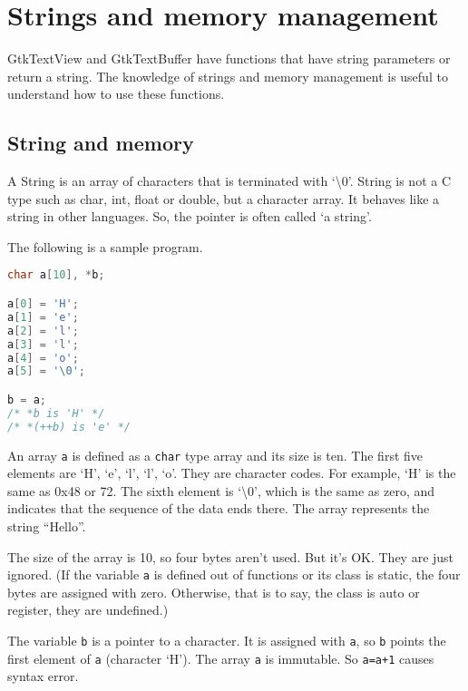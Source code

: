 \section{Strings and memory
management}\label{strings-and-memory-management}

GtkTextView and GtkTextBuffer have functions that have string parameters
or return a string. The knowledge of strings and memory management is
useful to understand how to use these functions.

\subsection{String and memory}\label{string-and-memory}

A String is an array of characters that is terminated with
`\textbackslash0'. String is not a C type such as char, int, float or
double, but a character array. It behaves like a string in other
languages. So, the pointer is often called `a string'.

The following is a sample program.

\begin{lstlisting}[language=C]
char a[10], *b;

a[0] = 'H';
a[1] = 'e';
a[2] = 'l';
a[3] = 'l';
a[4] = 'o';
a[5] = '\0';

b = a;
/* *b is 'H' */
/* *(++b) is 'e' */
\end{lstlisting}

An array \passthrough{\lstinline!a!} is defined as a
\passthrough{\lstinline!char!} type array and its size is ten. The first
five elements are `H', `e', `l', `l', `o'. They are character codes. For
example, `H' is the same as 0x48 or 72. The sixth element is
`\textbackslash0', which is the same as zero, and indicates that the
sequence of the data ends there. The array represents the string
``Hello''.

The size of the array is 10, so four bytes aren't used. But it's OK.
They are just ignored. (If the variable \passthrough{\lstinline!a!} is
defined out of functions or its class is static, the four bytes are
assigned with zero. Otherwise, that is to say, the class is auto or
register, they are undefined.)

The variable \passthrough{\lstinline!b!} is a pointer to a character. It
is assigned with \passthrough{\lstinline!a!}, so
\passthrough{\lstinline!b!} points the first element of
\passthrough{\lstinline!a!} (character `H'). The array
\passthrough{\lstinline!a!} is immutable. So
\passthrough{\lstinline!a=a+1!} causes syntax error.

